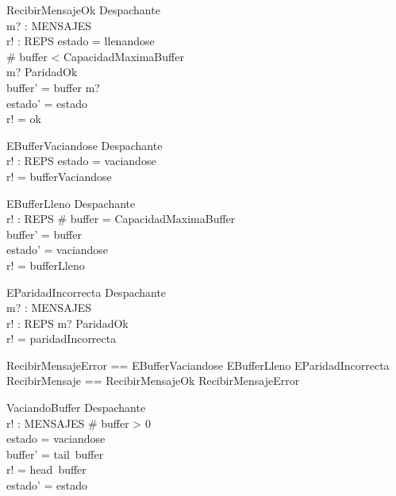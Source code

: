 \documentclass[11pt]{article}
\begin{document}
\begin{schema}{RecibirMensajeOk}
\Delta Despachante \\
m? : MENSAJES \\
r! : REPS
\where
estado = llenandose \\
\# buffer < CapacidadMaximaBuffer \\
m? \in ParidadOk \\
buffer' = buffer \cat \langle m? \rangle \\
estado' = estado \\
r! = ok
\end{schema}

\begin{schema}{EBufferVaciandose}
\Xi Despachante \\
r! : REPS
\where
estado = vaciandose \\
r! = bufferVaciandose
\end{schema}

\begin{schema}{EBufferLleno}
\Delta Despachante \\
r! : REPS 
\where
\# buffer = CapacidadMaximaBuffer \\
buffer' = buffer \\
estado' = vaciandose \\
r! = bufferLleno
\end{schema}

\begin{schema}{EParidadIncorrecta}
\Xi Despachante \\
m? : MENSAJES \\
r! : REPS
\where
m? \notin ParidadOk \\
r! = paridadIncorrecta
\end{schema}

\begin{zed}
RecibirMensajeError == EBufferVaciandose \lor EBufferLleno \lor EParidadIncorrecta \\
RecibirMensaje == RecibirMensajeOk \lor RecibirMensajeError
\end{zed}

\begin{schema}{VaciandoBuffer}
\Delta Despachante \\
r! : MENSAJES
\where
\# buffer > 0 \\
estado = vaciandose \\
buffer' = tail~buffer \\
r! = head~buffer \\
estado' = estado 
\end{schema}
\end{document}
